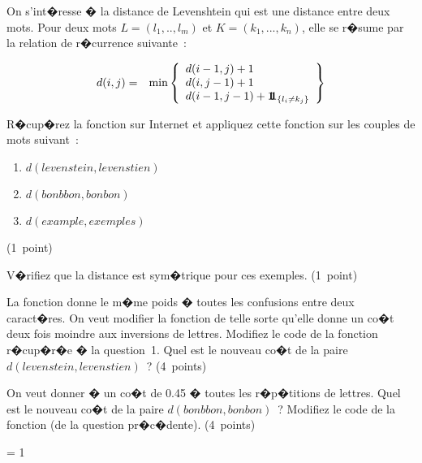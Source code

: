 \exosubject{}
\begin{xexercice}\label{td_note_label3_2014}%

On s'int�resse � la distance de Levenshtein qui est une distance entre deux mots. Pour deux mots $L=(l_1,..,l_m)$ et $K=(k_1,...,k_n)$, elle se r�sume par la relation de r�currence suivante~:

\begin{eqnarray}
d(i,j) &=&  \min \left \{ \begin{array}{l}  d(i-1,j) + 1 \\ d(i,j-1) + 1 \\ d(i-1,j-1) + \mathbf{1\!\!1}_{\left\{ l_i \neq k_j \right\}} \end{array} \right \} \label{td2013_eq21}
\end{eqnarray}

\exequest R�cup�rez la fonction sur Internet et appliquez cette fonction sur les couples de mots suivant~:

\begin{enumerate}
\item $d(levenstein,levenstien)$
\item $d(bonbbon,bonbon)$
\item $d(example,exemples)$
\end{enumerate}

(1~point)

\exequest V�rifiez que la distance est sym�trique pour ces exemples. (1~point)

\exequest La fonction donne le m�me poids � toutes les confusions entre deux caract�res. On veut modifier la fonction de telle sorte qu'elle donne un co�t deux fois moindre aux inversions de lettres. Modifiez le code de la fonction r�cup�r�e � la question~1. Quel est le nouveau co�t de la paire $d(levenstein,levenstien)$~?  (4~points)

\exequest On veut donner � un co�t de 0.45 � toutes les r�p�titions de lettres. Quel est le nouveau co�t de la paire $d(bonbbon,bonbon)$~? Modifiez le code de la fonction (de la question pr�c�dente). (4~points)


\end{xexercice}



\ifnum\correctionenonce = 1

